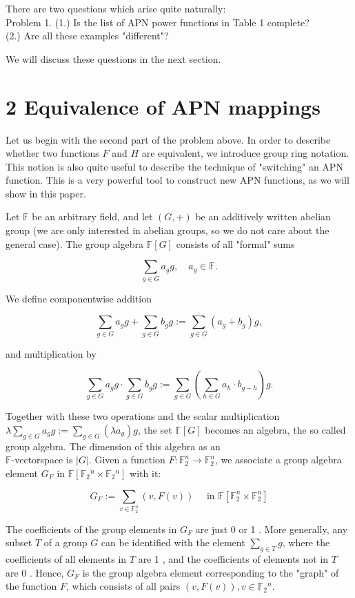 \documentclass[10pt]{article}
\begin{document}
There are two questions which arise quite naturally:\\
Problem 1. (1.) Is the list of APN power functions in Table 1 complete?\\
(2.) Are all these examples "different"?

We will discuss these questions in the next section.

\section*{2 Equivalence of APN mappings}
Let us begin with the second part of the problem above. In order to describe whether two functions $F$ and $H$ are equivalent, we introduce group ring notation. This notion is also quite useful to describe the technique of "switching" an APN function. This is a very powerful tool to construct new APN functions, as we will show in this paper.

Let $\mathbb{F}$ be an arbitrary field, and let $(G,+)$ be an additively written abelian group (we are only interested in abelian groups, so we do not care about the general case). The group algebra $\mathbb{F}[G]$ consists of all "formal" sums

$$
\sum_{g \in G} a_{g} g, \quad a_{g} \in \mathbb{F} .
$$

We define componentwise addition

$$
\sum_{g \in G} a_{g} g+\sum_{g \in G} b_{g} g:=\sum_{g \in G}\left(a_{g}+b_{g}\right) g,
$$

and multiplication by

$$
\sum_{g \in G} a_{g} g \cdot \sum_{g \in G} b_{g} g:=\sum_{g \in G}\left(\sum_{h \in G} a_{h} \cdot b_{g-h}\right) g .
$$

Together with these two operations and the scalar multiplication $\lambda \sum_{g \in G} a_{g} g:=\sum_{g \in G}\left(\lambda a_{g}\right) g$, the set $\mathbb{F}[G]$ becomes an algebra, the so called group algebra. The dimension of this algebra as an\\
$\mathbb{F}$-vectorspace is $|G|$. Given a function $F: \mathbb{F}_{2}^{n} \rightarrow \mathbb{F}_{2}^{n}$, we associate a group algebra element $G_{F}$ in $\mathbb{F}\left[\mathbb{F}_{2}{ }^{n} \times \mathbb{F}_{2}{ }^{n}\right]$ with it:

$$
G_{F}:=\sum_{v \in \mathbb{F}_{2}^{n}}(v, F(v)) \quad \text { in } \mathbb{F}\left[\mathbb{F}_{2}^{n} \times \mathbb{F}_{2}^{n}\right]
$$

The coefficients of the group elements in $G_{F}$ are just 0 or 1 . More generally, any subset $T$ of a group $G$ can be identified with the element $\sum_{g \in T} g$, where the coefficients of all elements in $T$ are 1 , and the coefficients of elements not in $T$ are 0 . Hence, $G_{F}$ is the group algebra element corresponding to the "graph" of the function $F$, which consists of all pairs $(v, F(v)), v \in \mathbb{F}_{2}{ }^{n}$.
\end{document}
